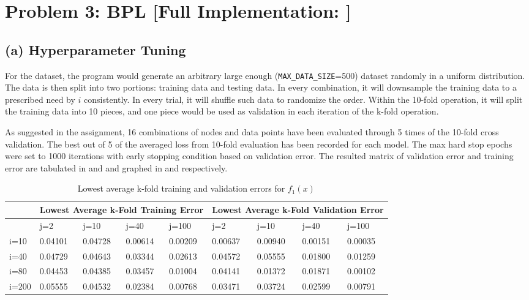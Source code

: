 \documentclass{tron}
\begin{document}
\newpage
\section{Problem 3: BPL [Full Implementation: ]}
\subsection{(a) Hyperparameter Tuning}
For the dataset, the program would generate an arbitrary large enough (\verb|MAX_DATA_SIZE|=500) dataset randomly in a uniform distribution. The data is then split into two portions: training data and testing data. In every combination, it will downsample the training data to a prescribed need by $i$ consistently. In every trial, it will shuffle such data to randomize the order. Within the 10-fold operation, it will split the training data into 10 pieces, and one piece would be used as validation in each iteration of the k-fold operation.

As suggested in the assignment, 16 combinations of nodes and data points have been evaluated through 5 times of the 10-fold cross validation. The best out of 5 of the averaged loss from 10-fold evaluation has been recorded for each model. The max hard stop epochs were set to 1000 iterations with early stopping condition based on validation error. The resulted matrix of validation error and training error are tabulated in  and  and graphed in  and  respectively.

\begin{table}[H]
	\centering
	\begin{tabular}{ |p{1.5cm}||p{1.5cm}|p{1.5cm}|p{1.5cm}|p{1.5cm}||p{1.5cm}|p{1.5cm}|p{1.5cm}|p{1.5cm}|  }
	 \hline
	 	& \multicolumn{4}{|c|}{Lowest Average k-Fold Training Error} & \multicolumn{4}{|c|}{Lowest Average k-Fold Validation Error} \\
	 \hline
	   	& j=2 & j=10 & j=40 & j=100 & j=2 & j=10 & j=40 & j=100\\
	 \hline
	 \hline
	i=10  & 0.04101 & 0.04728 & 0.00614 & 0.00209 & 0.00637 & 0.00940 & 0.00151 & 0.00035 \\
	\hline
	i=40  & 0.04729 & 0.04643 & 0.03344 & 0.02613 & 0.04572 & 0.05555 & 0.01800 & 0.01259 \\
	\hline
	i=80  & 0.04453 & 0.04385 & 0.03457 & 0.01004 & 0.04141 & 0.01372 & 0.01871 & \cellcolor{red!20!white} 0.00102 \\
	\hline
	i=200 & 0.05555 & 0.04532 & 0.02384 & 0.00768 & 0.03471 & 0.03724 & 0.02599 & 0.00791 \\
	\hline
	 \hline
	\end{tabular}
	\caption{Lowest average k-fold training and validation errors for $f_1(x)$}
	\label{table:16tests:1}
\end{table}
\end{document}
